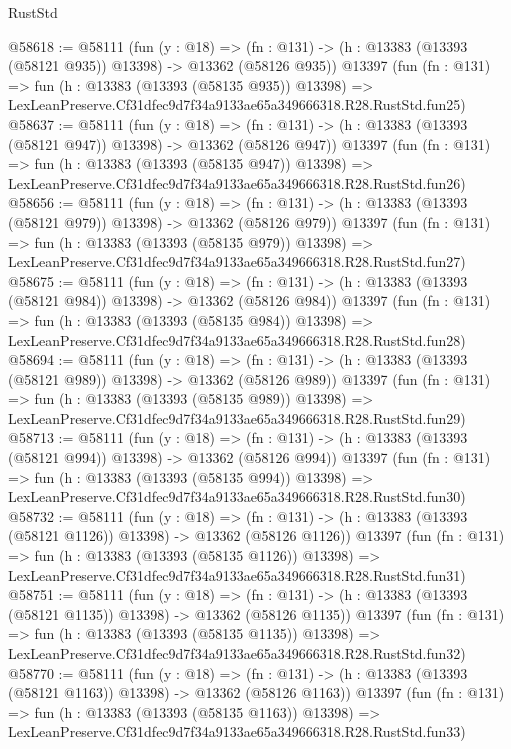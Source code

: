 \begin{lexlean}{RustStd}
\begin{coremodule}
@58618 := @58111
    (fun (y : @18) =>
    (fn : @131) -> (h : @13383 (@13393 (@58121 @935)) @13398) -> @13362 (@58126 @935))
    @13397
    (fun (fn : @131) =>
    fun (h : @13383 (@13393 (@58135 @935)) @13398) =>
    LexLeanPreserve.Cf31dfec9d7f34a9133ae65a349666318.R28.RustStd.fun25)
@58637 := @58111
    (fun (y : @18) =>
    (fn : @131) -> (h : @13383 (@13393 (@58121 @947)) @13398) -> @13362 (@58126 @947))
    @13397
    (fun (fn : @131) =>
    fun (h : @13383 (@13393 (@58135 @947)) @13398) =>
    LexLeanPreserve.Cf31dfec9d7f34a9133ae65a349666318.R28.RustStd.fun26)
@58656 := @58111
    (fun (y : @18) =>
    (fn : @131) -> (h : @13383 (@13393 (@58121 @979)) @13398) -> @13362 (@58126 @979))
    @13397
    (fun (fn : @131) =>
    fun (h : @13383 (@13393 (@58135 @979)) @13398) =>
    LexLeanPreserve.Cf31dfec9d7f34a9133ae65a349666318.R28.RustStd.fun27)
@58675 := @58111
    (fun (y : @18) =>
    (fn : @131) -> (h : @13383 (@13393 (@58121 @984)) @13398) -> @13362 (@58126 @984))
    @13397
    (fun (fn : @131) =>
    fun (h : @13383 (@13393 (@58135 @984)) @13398) =>
    LexLeanPreserve.Cf31dfec9d7f34a9133ae65a349666318.R28.RustStd.fun28)
@58694 := @58111
    (fun (y : @18) =>
    (fn : @131) -> (h : @13383 (@13393 (@58121 @989)) @13398) -> @13362 (@58126 @989))
    @13397
    (fun (fn : @131) =>
    fun (h : @13383 (@13393 (@58135 @989)) @13398) =>
    LexLeanPreserve.Cf31dfec9d7f34a9133ae65a349666318.R28.RustStd.fun29)
@58713 := @58111
    (fun (y : @18) =>
    (fn : @131) -> (h : @13383 (@13393 (@58121 @994)) @13398) -> @13362 (@58126 @994))
    @13397
    (fun (fn : @131) =>
    fun (h : @13383 (@13393 (@58135 @994)) @13398) =>
    LexLeanPreserve.Cf31dfec9d7f34a9133ae65a349666318.R28.RustStd.fun30)
@58732 := @58111
    (fun (y : @18) =>
    (fn : @131) -> (h : @13383 (@13393 (@58121 @1126)) @13398) -> @13362 (@58126 @1126))
    @13397
    (fun (fn : @131) =>
    fun (h : @13383 (@13393 (@58135 @1126)) @13398) =>
    LexLeanPreserve.Cf31dfec9d7f34a9133ae65a349666318.R28.RustStd.fun31)
@58751 := @58111
    (fun (y : @18) =>
    (fn : @131) -> (h : @13383 (@13393 (@58121 @1135)) @13398) -> @13362 (@58126 @1135))
    @13397
    (fun (fn : @131) =>
    fun (h : @13383 (@13393 (@58135 @1135)) @13398) =>
    LexLeanPreserve.Cf31dfec9d7f34a9133ae65a349666318.R28.RustStd.fun32)
@58770 := @58111
    (fun (y : @18) =>
    (fn : @131) -> (h : @13383 (@13393 (@58121 @1163)) @13398) -> @13362 (@58126 @1163))
    @13397
    (fun (fn : @131) =>
    fun (h : @13383 (@13393 (@58135 @1163)) @13398) =>
    LexLeanPreserve.Cf31dfec9d7f34a9133ae65a349666318.R28.RustStd.fun33)

\end{coremodule}
\end{lexlean}
